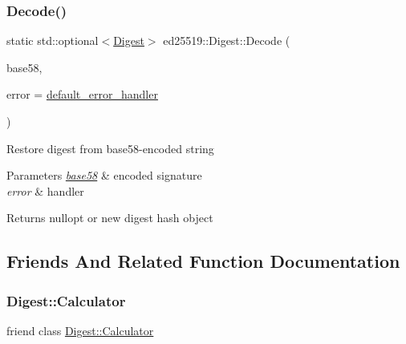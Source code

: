\subsubsection{\texorpdfstring{Decode()}{Decode()}}
{\footnotesize\ttfamily static std\+::optional$<$\mbox{\hyperlink{classed25519_1_1_digest}{Digest}}$>$ ed25519\+::\+Digest\+::\+Decode (\begin{DoxyParamCaption}\item[{const std\+::string \&}]{base58,  }\item[{const \mbox{\hyperlink{namespaceed25519_a6ba572942b3c18591fc869d52a6b16e6}{Error\+Handler}} \&}]{error = {\ttfamily \mbox{\hyperlink{namespaceed25519_a7c7bb6ed17541162959c33ed3e3b15fb}{default\+\_\+error\+\_\+handler}}} }\end{DoxyParamCaption})\hspace{0.3cm}{\ttfamily [static]}}

Restore digest from base58-\/encoded string 
\begin{DoxyParams}{Parameters}
{\em \mbox{\hyperlink{namespaceed25519_1_1base58}{base58}}} & encoded signature \\
\hline
{\em error} & handler \\
\hline
\end{DoxyParams}
\begin{DoxyReturn}{Returns}
nullopt or new digest hash object 
\end{DoxyReturn}


\subsection{Friends And Related Function Documentation}
\mbox{\label{classed25519_1_1_digest_a27f0effdfdf5c477d7471486da0e67a6}} 
\subsubsection{\texorpdfstring{Digest\+::\+Calculator}{Digest::Calculator}}
{\footnotesize\ttfamily friend class \mbox{\hyperlink{structed25519_1_1_digest_1_1_calculator}{Digest\+::\+Calculator}}\hspace{0.3cm}{\ttfamily [friend]}}

\mbox{\label{classed25519_1_1_digest_aeb2790f4039920f65160ef1e580122be}} 
